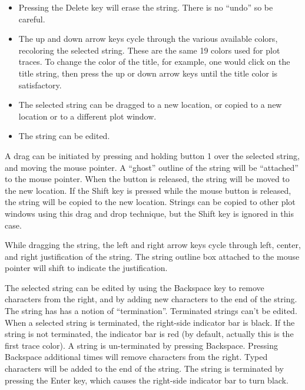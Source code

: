 \begin{itemize}
\item{Pressing the {\cb Delete} key will erase the string.  There is
no ``undo'' so be careful.}

\item{The up and down arrow keys cycle through the various available
colors, recoloring the selected string.  These are the same 19 colors
used for plot traces.  To change the color of the title, for example,
one would click on the title string, then press the up or down arrow
keys until the title color is satisfactory.}

\item{The selected string can be dragged to a new location, or copied
to a new location or to a different plot window.}

\item{The string can be edited.}
\end{itemize}

A drag can be initiated by pressing and holding button 1 over the
selected string, and moving the mouse pointer.  A ``ghost'' outline of
the string will be ``attached'' to the mouse pointer.  When the button
is released, the string will be moved to the new location.  If the
{\kb Shift} key is pressed while the mouse button is released, the
string will be copied to the new location.  Strings can be copied to
other plot windows using this drag and drop technique, but the {\kb
Shift} key is ignored in this case.

While dragging the string, the left and right arrow keys cycle through
left, center, and right justification of the string.  The string
outline box attached to the mouse pointer will shift to indicate the
justification.

The selected string can be edited by using the {\kb Backspace} key to
remove characters from the right, and by adding new characters to the
end of the string.  The string has has a notion of ``termination''. 
Terminated strings can't be edited.  When a selected string is
terminated, the right-side indicator bar is black.  If the string is
not terminated, the indicator bar is red (by default, actually this is
the first trace color).  A string is un-terminated by pressing {\kb
Backspace}.  Pressing {\kb Backspace} additional times will remove
characters from the right.  Typed characters will be added to the end
of the string.  The string is terminated by pressing the {\kb Enter}
key, which causes the right-side indicator bar to turn black.

